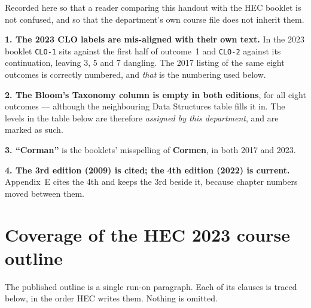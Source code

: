 \begin{alertbox}
Recorded here so that a reader comparing this handout with the HEC booklet is
not confused, and so that the department's own course file does not inherit
them.

\smallskip
\textbf{1. The 2023 CLO labels are mis-aligned with their own text.} In the
2023 booklet \texttt{CLO-1} sits against the first half of outcome~1 and
\texttt{CLO-2} against its continuation, leaving 3, 5 and 7 dangling. The 2017
listing of the same eight outcomes is correctly numbered, and \emph{that} is
the numbering used below.

\smallskip
\textbf{2. The Bloom's Taxonomy column is empty in both editions}, for all
eight outcomes --- although the neighbouring Data Structures table fills it in.
The levels in the table below are therefore \emph{assigned by this department},
and are marked as such.

\smallskip
\textbf{3. ``Corman''} is the booklets' misspelling of \textbf{Cormen}, in both
2017 and 2023.

\smallskip
\textbf{4. The 3rd edition (2009) is cited; the 4th edition (2022) is
current.} Appendix~E cites the 4th and keeps the 3rd beside it, because
chapter numbers moved between them.
\end{alertbox}

\section*{Coverage of the HEC 2023 course outline}

The published outline is a single run-on paragraph. Each of its clauses is
traced below, in the order HEC writes them. Nothing is omitted.

